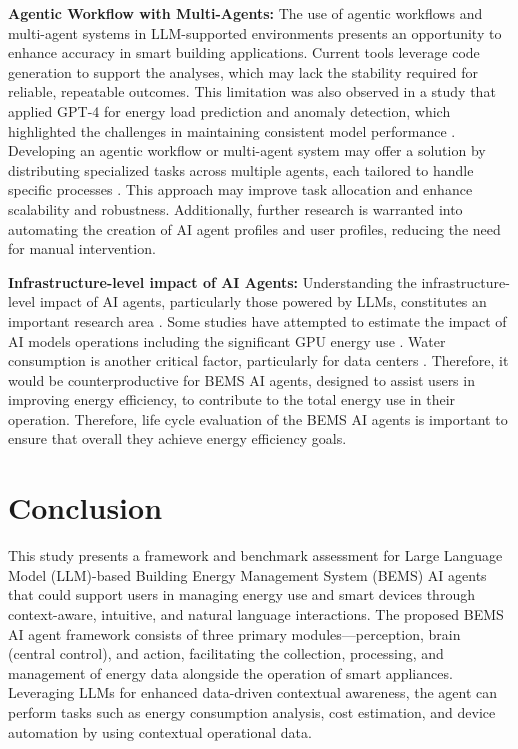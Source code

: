 \documentclass[final,3p,times]{elsarticle}
\begin{document}
\textbf{Agentic Workflow with Multi-Agents:} The use of agentic workflows and multi-agent systems in LLM-supported environments presents an opportunity to enhance accuracy in smart building applications. Current tools leverage code generation to support the analyses, which may lack the stability required for reliable, repeatable outcomes. This limitation was also observed in a study that applied GPT-4 for energy load prediction and anomaly detection, which highlighted the challenges in maintaining consistent model performance \cite{zhang2024generative}. Developing an agentic workflow or multi-agent system may offer a solution by distributing specialized tasks across multiple agents, each tailored to handle specific processes \cite{wu2023autogen}. This approach may improve task allocation and enhance scalability and robustness. Additionally, further research is warranted into automating the creation of AI agent profiles and user profiles, reducing the need for manual intervention.

\textbf{Infrastructure-level impact of AI Agents:} Understanding the infrastructure-level impact of AI agents, particularly those powered by LLMs, constitutes an important research area \cite{ludvigsen2023carbon}. Some studies have attempted to estimate the impact of AI models operations including the significant GPU energy use \cite{luccioni2024power}. Water consumption is another critical factor, particularly for data centers \cite{luccioni2023estimating}. Therefore, it would be counterproductive for BEMS AI agents, designed to assist users in improving energy efficiency, to contribute to the total energy use in their operation. Therefore, life cycle evaluation of the BEMS AI agents is important to ensure that overall they achieve energy efficiency goals. 

\section{Conclusion}
\label{sec:conclusion}

This study presents a framework and benchmark assessment for Large Language Model (LLM)-based Building Energy Management System (BEMS) AI agents that could support users in managing energy use and smart devices through context-aware, intuitive, and natural language interactions. The proposed BEMS AI agent framework consists of three primary modules---perception, brain (central control), and action, facilitating the collection, processing, and management of energy data alongside the operation of smart appliances. Leveraging LLMs for enhanced data-driven contextual awareness, the agent can perform tasks such as energy consumption analysis, cost estimation, and device automation by using contextual operational data.
\end{document}
